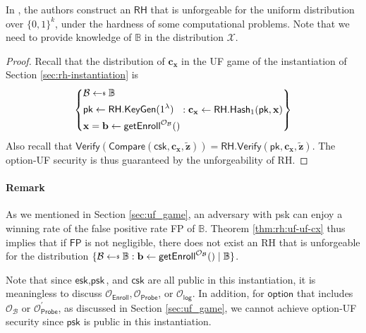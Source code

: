 In \cite{cryptoeprint:2014/394}, the authors construct an $\textsf{RH}$ that is unforgeable for the uniform distribution over $\{0, 1\}^k$, under the hardness of some computational problems. Note that we need to provide knowledge of $\mathbb{B}$ in the distribution $\mathcal{X}$.

\begin{proof}

Recall that the distribution of $\mathbf{c_x}$ in the \textsf{UF} game of the instantiation of Section \ref{sec:rh-instantiation} is
\[
	\left \{
		\begin{aligned} 
			 & \mathcal{B} \getsdollar \mathbb{B} \\
			 & \textsf{pk} \gets \textsf{RH.KeyGen}(1^\lambda) \\
			 & \mathbf{x} = \mathbf{b} \gets \textsf{getEnroll}^{\mathcal{O}_\mathcal{B}}() 
		\end{aligned} :
		\mathbf{c_x} \gets \textsf{RH.Hash}_1(\textsf{pk}, \mathbf{x})
	\right \}
\]
Also recall that $\textsf{Verify}(\textsf{Compare}(\textsf{csk}, \mathbf{c_x}, \mathbf{\tilde{z}} )) = \textsf{RH.Verify}(\textsf{pk}, \mathbf{c_x}, \mathbf{\tilde{z}} )$.
The \textsf{option}-UF security is thus guaranteed by the unforgeability of \textsf{RH}.

\end{proof}

\paragraph{Remark}
As we mentioned in Section \ref{sec:uf_game}, an adversary with \textsf{psk} can enjoy a winning rate of the false positive rate \textsf{FP} of $\mathbb{B}$. Theorem \ref{thm:rh:uf-uf-cx} thus implies that if $\textsf{FP}$ is not negligible, there does not exist an \textsf{RH} that is unforgeable for the distribution $\{ \mathcal{B} \getsdollar \mathbb{B}: \mathbf{b} \gets {\sf getEnroll}^{\mathcal{O}_\mathcal{B}}() \mid \mathbb{B} \}$.


Note that since $\textsf{esk}, \textsf{psk}$, and $ \textsf{csk}$ are all public in this instantiation, it is meaningless to discuss $\mathcal{O}_\textsf{Enroll}, \mathcal{O}_\textsf{Probe}$, or $\mathcal{O}_\textsf{log}$. In addition, for $\textsf{option}$ that includes $\mathcal{O}_\mathcal{B}$ or $\mathcal{O}_\textsf{Probe}^\prime$, as discussed in Section \ref{sec:uf_game}, we cannot achieve \textsf{option}-UF security since $\textsf{psk}$ is public in this instantiation.

